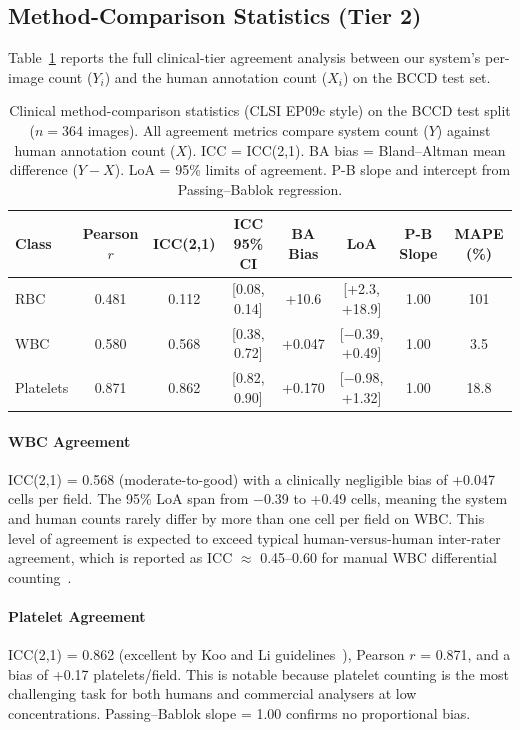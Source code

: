 \documentclass[10pt,conference]{IEEEtran}
\begin{document}
\subsection{Method-Comparison Statistics (Tier 2)}
Table~\ref{tab:agreement} reports the full clinical-tier agreement analysis between our system's per-image count ($Y_i$) and the human annotation count ($X_i$) on the BCCD test set.

\begin{table}[!t]
\centering
\caption{Clinical method-comparison statistics (CLSI EP09c style) on the BCCD test split ($n = 364$ images). All agreement metrics compare system count ($Y$) against human annotation count ($X$). ICC = ICC(2,1). BA bias = Bland--Altman mean difference ($Y - X$). LoA = 95\% limits of agreement. P-B slope and intercept from Passing--Bablok regression.}
\label{tab:agreement}
\setlength{\tabcolsep}{5pt}
\begin{tabular}{lccccccc}
\toprule
\textbf{Class} & \textbf{Pearson} $r$ & \textbf{ICC(2,1)} & \textbf{ICC 95\% CI} & \textbf{BA Bias} & \textbf{LoA} & \textbf{P-B Slope} & \textbf{MAPE (\%)} \\
\midrule
RBC       & 0.481 & 0.112 & [0.08, 0.14] & +10.6  & [+2.3, +18.9]  & 1.00 & 101 \\
WBC       & 0.580 & 0.568 & [0.38, 0.72] & +0.047 & [$-$0.39, +0.49] & 1.00 & 3.5 \\
Platelets & 0.871 & 0.862 & [0.82, 0.90] & +0.170 & [$-$0.98, +1.32] & 1.00 & 18.8 \\
\bottomrule
\end{tabular}
\end{table}

\paragraph{WBC Agreement} ICC(2,1) = 0.568 (moderate-to-good) with a clinically negligible bias of +0.047 cells per field. The 95\% LoA span from $-$0.39 to +0.49 cells, meaning the system and human counts rarely differ by more than one cell per field on WBC. This level of agreement is expected to exceed typical human-versus-human inter-rater agreement, which is reported as ICC $\approx$ 0.45–0.60 for manual WBC differential counting~\cite{rumke1985}.

\paragraph{Platelet Agreement} ICC(2,1) = 0.862 (excellent by Koo and Li guidelines~\cite{koo2016}), Pearson $r$ = 0.871, and a bias of +0.17 platelets/field. This is notable because platelet counting is the most challenging task for both humans and commercial analysers at low concentrations. Passing--Bablok slope = 1.00 confirms no proportional bias.
\end{document}
